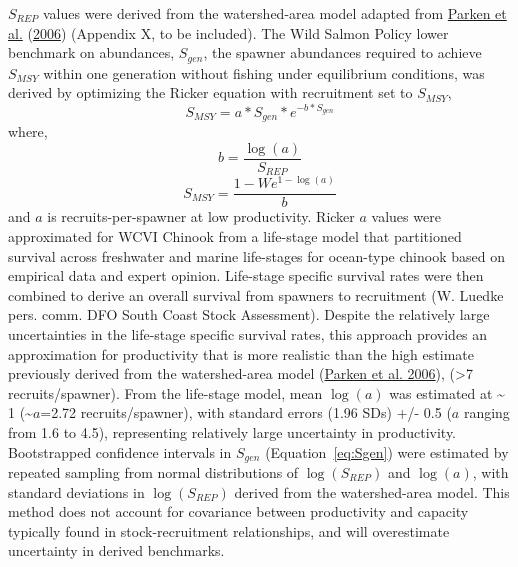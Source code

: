 \documentclass[11pt]{book}
\begin{document}
\(S_{REP}\) values were derived from the watershed-area model adapted from \protect\hyperlink{ref-parkenHabitatbasedMethodsEstimate2006}{Parken et al.} (\protect\hyperlink{ref-parkenHabitatbasedMethodsEstimate2006}{2006}) (Appendix X, to be included). The Wild Salmon Policy lower benchmark on abundances, \(S_{gen}\), the spawner abundances required to achieve \(S_{MSY}\) within one generation without fishing under equilibrium conditions, was derived by optimizing the Ricker equation with recruitment set to \(S_{MSY}\),
\begin{equation}
  S_{MSY} = a * S_{gen}* e^{-b * S_{gen}}
   \label{eq:Sgen}
\end{equation}
where,
\begin{equation}
  b = \frac{\log(a)}{S_{REP}}
   \label{eq:ricB}
\end{equation}
\begin{equation}
  S_{MSY} = \frac{1 - W{e^{1-\log(a)}} } {b}
   \label{eq:SMSY}
\end{equation}
and \(a\) is recruits-per-spawner at low productivity. Ricker \(a\) values were approximated for WCVI Chinook from a life-stage model that partitioned survival across freshwater and marine life-stages for ocean-type chinook based on empirical data and expert opinion. Life-stage specific survival rates were then combined to derive an overall survival from spawners to recruitment (W. Luedke pers. comm. DFO South Coast Stock Assessment). Despite the relatively large uncertainties in the life-stage specific survival rates, this approach provides an approximation for productivity that is more realistic than the high estimate previously derived from the watershed-area model (\protect\hyperlink{ref-parkenHabitatbasedMethodsEstimate2006}{Parken et al. 2006}), (\textgreater7 recruits/spawner). From the life-stage model, mean \(\log(a)\) was estimated at \textasciitilde{} 1 (\textasciitilde{}\(a\)=2.72 recruits/spawner), with standard errors (1.96 SDs) +/- 0.5 (\(a\) ranging from 1.6 to 4.5), representing relatively large uncertainty in productivity. Bootstrapped confidence intervals in \(S_{gen}\) (Equation~\ref{eq:Sgen}) were estimated by repeated sampling from normal distributions of \(\log(S_{REP})\) and \(\log(a)\), with standard deviations in \(\log(S_{REP})\) derived from the watershed-area model. This method does not account for covariance between productivity and capacity typically found in stock-recruitment relationships, and will overestimate uncertainty in derived benchmarks.
\end{document}
